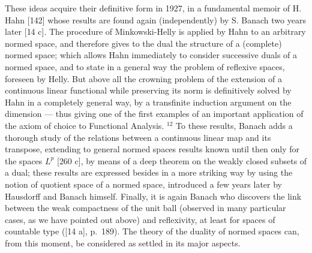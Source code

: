 These ideas acquire their definitive form in 1927, in a fundamental memoir of H. Hahn {[}142{]} whose results are found again (independently) by S. Banach two years later {[}14 c{]}. The procedure of Minkowski-Helly is applied by Hahn to an arbitrary normed space, and therefore gives to the dual the structure of a (complete) normed space; which allows Hahn immediately to consider successive duals of a normed space, and to state in a general way the problem of reflexive spaces, foreseen by Helly. But above all the crowning problem of the extension of a continuous linear functional while preserving its norm is definitively solved by Hahn in a completely general way, by a transfinite induction argument on the dimension --- thus giving one of the first examples of an important application of the axiom of choice to Functional Analysis. \(^{12}\) To these results, Banach adds a thorough study of the relations between a continuous linear map and its transpose, extending to general normed spaces results known until then only for the spaces \(L^{p}\) {[}260 c{]}, by means of a deep theorem on the weakly closed subsets of a dual; these results are expressed besides in a more striking way by using the notion of quotient space of a normed space, introduced a few years later by Hausdorff and Banach himself. Finally, it is again Banach who discovers the link between the weak compactness of the unit ball (observed in many particular cases, as we have pointed out above) and reflexivity, at least for spaces of countable type ({[}14 a{]}, p.~189). The theory of the duality of normed spaces can, from this moment, be considered as settled in its major aspects.

